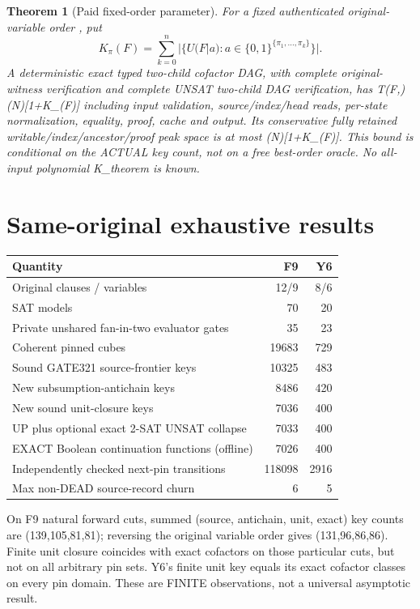 \documentclass[11pt]{article}
\newtheorem{theorem}{Theorem}
\begin{document}
\begin{theorem}[Paid fixed-order parameter]
For a fixed authenticated original-variable order \pi, put
\[K_\pi(F)=\sum_{k=0}^{n}|\{U(F|a):a\in\{0,1\}^{\{\pi_1,\ldots,\pi_k\}}\}|.\]
A deterministic exact typed two-child cofactor DAG, with complete original-witness verification and complete UNSAT two-child DAG verification, has T(F,\pi)\le{}(N)[1+K_\pi(F)] including input validation, source/index/head reads, per-state normalization, equality, proof, cache and output. Its conservative fully retained writable/index/ancestor/proof peak space is at most (N)[1+K_\pi(F)]. This bound is conditional on the ACTUAL key count, not on a free best-order oracle. No all-input polynomial K_\pi theorem is known.
\end{theorem}
\section*{Same-original exhaustive results}
\begin{center}\begin{tabular}{lrr}\toprule
Quantity & F9 & Y6\\\midrule
Original clauses / variables & 12/9 & 8/6\\
SAT models & 70 & 20\\
Private unshared fan-in-two evaluator gates & 35 & 23\\
Coherent pinned cubes & 19683 & 729\\
Sound GATE321 source-frontier keys & 10325 & 483\\
New subsumption-antichain keys & 8486 & 420\\
New sound unit-closure keys & 7036 & 400\\
UP plus optional exact 2-SAT UNSAT collapse & 7033 & 400\\
EXACT Boolean continuation functions (offline) & 7026 & 400\\
Independently checked next-pin transitions & 118098 & 2916\\
Max non-DEAD source-record churn & 6 & 5\\\bottomrule
\end{tabular}\end{center}
On F9 natural forward cuts, summed (source, antichain, unit, exact) key counts are (139,105,81,81); reversing the original variable order gives (131,96,86,86). Finite unit closure coincides with exact cofactors on those particular cuts, but not on all arbitrary pin sets. Y6's finite unit key equals its exact cofactor classes on every pin domain. These are FINITE observations, not a universal asymptotic result.
\end{document}
